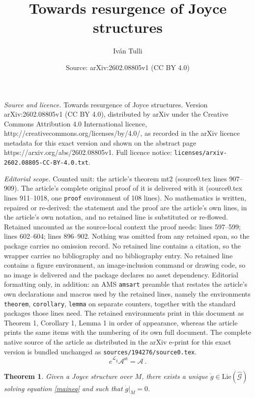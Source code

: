 \documentclass[10pt,a4paper]{amsart}
\title{Towards resurgence of Joyce structures}
\author{Iv\'an Tulli}
\date{Source: arXiv:2602.08805v1 (CC BY 4.0)}
\newtheorem{theorem}{Theorem}
\begin{document}
\maketitle

\noindent\emph{Source and licence.} Towards resurgence of Joyce structures. Version arXiv:2602.08805v1 (CC BY 4.0), distributed by arXiv under the Creative Commons Attribution 4.0 International licence, http://creativecommons.org/licenses/by/4.0/, as recorded in the arXiv licence metadata for this exact version and shown on the abstract page https://arxiv.org/abs/2602.08805v1. Full licence notice: \texttt{licenses/arxiv-2602.08805-CC-BY-4.0.txt}.\par\smallskip

\noindent\textit{Editorial scope.} Counted unit: the article's theorem mt2 (source0.tex lines 907--909). The article's complete original proof of it is delivered with it (source0.tex lines 911--1018, one \texttt{proof} environment of 108 lines). No mathematics is written, repaired or re-derived: the statement and the proof are the article's own lines, in the article's own notation, and no retained line is substituted or re-flowed.  Retained uncounted as the source-local context the proof needs: lines 597--599; lines 602--604; lines 896--902.  Nothing was omitted from any retained span, so the package carries no omission record.  No retained line contains a citation, so the wrapper carries no bibliography and no bibliography entry.  No retained line contains a figure environment, an image-inclusion command or drawing code, so no image is delivered and the package declares no asset dependency.  Editorial formatting only, in addition: an AMS \texttt{amsart} preamble that restates the article's own declarations and macros used by the retained lines, namely the environments \texttt{theorem}, \texttt{corollary}, \texttt{lemma} on separate counters, together with the standard packages those lines need.  The retained environments print in this document as Theorem 1, Corollary 1, Lemma 1 in order of appearance, whereas the article prints the same items with the numbering of its own full document.  The complete native source of the article as distributed in the arXiv e-print for this exact version is bundled unchanged as \texttt{sources/194276/source0.tex}.
\begin{equation}\label{maineq}
    e^{\mathcal{L}_{\dot{g}}}\mathcal{A}^{\text{st}}=\mathcal{A}\,.
\end{equation}

\begin{theorem}\label{mt1}
    Given a Joyce structure over $M$, there exists a unique $\dot{g}\in \text{Lie}(\widehat{\mathcal{G}})$ solving equation \eqref{maineq} and such that $\dot{g}|_{M}=0$.
\end{theorem}
\end{document}
